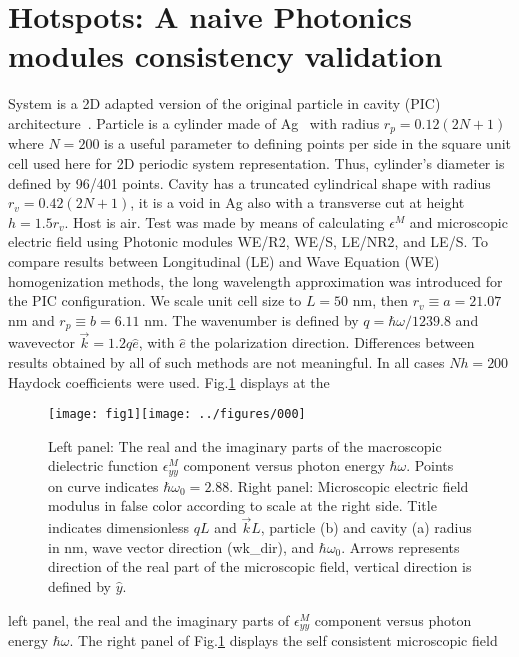 \documentclass[12pt]{report}
\begin{document}
\section*{Hotspots: A naive Photonics modules consistency validation}
System is a 2D adapted version of the original particle in cavity
(PIC) architecture~\cite{Huang(2011)}. Particle is a cylinder made of
Ag~\cite{Johnson(1972)} with radius $r_p=0.12(2N+1)$ where $N=200$ is
a useful parameter to defining points per side in the square unit cell
used here for 2D periodic system representation. Thus, cylinder's
diameter is defined by 96/401 points. Cavity has a truncated
cylindrical shape with radius $r_v=0.42(2N+1)$, it is a void in Ag
also with a transverse cut at height $h=1.5r_v$. Host is air. Test was
made by means of calculating $\epsilon^M$ and microscopic electric
field using Photonic modules WE/R2, WE/S, LE/NR2, and LE/S. To compare
results between Longitudinal (LE) and Wave Equation (WE)
homogenization methods, the long wavelength approximation was
introduced for the PIC configuration. We scale unit cell size to
$L=50$ nm, then $r_v\equiv a=21.07$ nm and $r_p\equiv b=6.11$ nm. The
wavenumber is defined by $q=\hbar\omega/1239.8$ and wavevector $\vec
k=1.2q \hat e$, with $\hat e$ the polarization direction. Differences
between results obtained by all of such methods are not meaningful. In
all cases $Nh=200$ Haydock coefficients were used. Fig.\ref{fig:fig1}
displays at the
\begin{figure}[htb]
  \begin{center}
    \texttt{[image: fig1]}\texttt{[image: ../figures/000]}
    \caption{\label{fig:fig1} Left panel: The real and the imaginary
      parts of the macroscopic dielectric function $\epsilon^M_{yy}$
      component versus photon energy $\hbar\omega$. Points on curve
      indicates $\hbar\omega_0=2.88$. Right panel: Microscopic
      electric field modulus in false color according to scale at the
      right side. Title indicates dimensionless $qL$ and $\vec kL$,
      particle (b) and cavity (a) radius in nm, wave vector direction
      (wk\_dir), and $\hbar\omega_0$. Arrows represents direction of
      the real part of the microscopic field, vertical direction is
      defined by $\hat y$.}
  \end{center}
\end{figure}
left panel, the real and the imaginary parts of $\epsilon^M_{yy}$
component versus photon energy $\hbar\omega$. The right panel of
Fig.\ref{fig:fig1} displays the self consistent microscopic field
\end{document}
